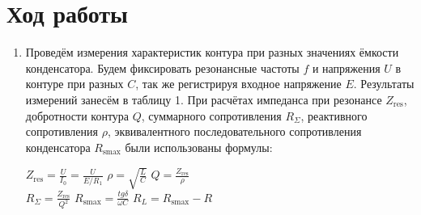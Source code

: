 \documentclass[a4paper]{article}
\begin{document}
\section{Ход работы}
\begin{enumerate}
    \item Проведём измерения характеристик контура при разных значениях ёмкости конденсатора. Будем фиксировать резонансные частоты $f$ и напряжения $U$ в контуре при разных $C$, так же регистрируя входное напряжение $E$. Результаты измерений занесём в таблицу 1. При расчётах импеданса при резонансе $Z_\text{res}$, добротности контура $Q$, суммарного сопротивления $R_{\Sigma}$, реактивного сопротивления $\rho$, эквивалентного последовательного сопротивления конденсатора $R_\text{smax}$ были использованы формулы:

          \begin{center}
              $Z_\text{res} = \frac{U}{I_0} = \frac{U}{E/R_1}$ \hspace{1cm} $\rho = \sqrt{\frac{L}{C}}$\hspace{1cm} $Q = \frac{Z_\text{res}}{\rho}$ \\
              $R_{\Sigma} = \frac{Z_\text{res}}{Q^2}$ \hspace{1cm} $R_\text{smax} = \frac{tg\delta}{\omega C}$ \hspace{1cm} $R_L = R_\text{smax} - R$
          \end{center}


\end{enumerate}
\end{document}

